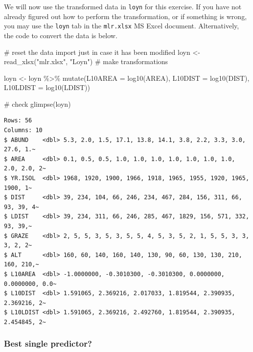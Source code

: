 \documentclass[
  10pt,
  letterpaper,
  DIV=11,
  numbers=noendperiod]{scrartcl}
\newenvironment{Shaded}{\begin{snugshade}}{\end{snugshade}}
\newcommand{\AttributeTok}[1]{\textcolor[rgb]{0.40,0.45,0.13}{#1}}
\newcommand{\CommentTok}[1]{\textcolor[rgb]{0.37,0.37,0.37}{#1}}
\newcommand{\FunctionTok}[1]{\textcolor[rgb]{0.28,0.35,0.67}{#1}}
\newcommand{\NormalTok}[1]{\textcolor[rgb]{0.00,0.23,0.31}{#1}}
\newcommand{\OtherTok}[1]{\textcolor[rgb]{0.00,0.23,0.31}{#1}}
\newcommand{\SpecialCharTok}[1]{\textcolor[rgb]{0.37,0.37,0.37}{#1}}
\newcommand{\StringTok}[1]{\textcolor[rgb]{0.13,0.47,0.30}{#1}}
\begin{document}
We will now use the transformed data in \texttt{loyn} for this exercise.
If you have not already figured out how to perform the transformation,
or if something is wrong, you may use the \texttt{loyn} tab in the
\texttt{mlr.xlsx} MS Excel document. Alternatively, the code to convert
the data is below.

\begin{Shaded}
\begin{Highlighting}[]
\CommentTok{\# reset the data import just in case it has been modified}
\NormalTok{loyn }\OtherTok{\textless{}{-}} \FunctionTok{read\_xlsx}\NormalTok{(}\StringTok{"mlr.xlsx"}\NormalTok{, }\StringTok{"Loyn"}\NormalTok{)}
\CommentTok{\# make transformations}

\NormalTok{loyn }\OtherTok{\textless{}{-}}\NormalTok{ loyn }\SpecialCharTok{\%\textgreater{}\%}
  \FunctionTok{mutate}\NormalTok{(}\AttributeTok{L10AREA =} \FunctionTok{log10}\NormalTok{(AREA),}
    \AttributeTok{L10DIST =} \FunctionTok{log10}\NormalTok{(DIST),}
    \AttributeTok{L10LDIST =} \FunctionTok{log10}\NormalTok{(LDIST))}

\CommentTok{\# check}
\FunctionTok{glimpse}\NormalTok{(loyn)}
\end{Highlighting}
\end{Shaded}

\begin{verbatim}
Rows: 56
Columns: 10
$ ABUND    <dbl> 5.3, 2.0, 1.5, 17.1, 13.8, 14.1, 3.8, 2.2, 3.3, 3.0, 27.6, 1.~
$ AREA     <dbl> 0.1, 0.5, 0.5, 1.0, 1.0, 1.0, 1.0, 1.0, 1.0, 1.0, 2.0, 2.0, 2~
$ YR.ISOL  <dbl> 1968, 1920, 1900, 1966, 1918, 1965, 1955, 1920, 1965, 1900, 1~
$ DIST     <dbl> 39, 234, 104, 66, 246, 234, 467, 284, 156, 311, 66, 93, 39, 4~
$ LDIST    <dbl> 39, 234, 311, 66, 246, 285, 467, 1829, 156, 571, 332, 93, 39,~
$ GRAZE    <dbl> 2, 5, 5, 3, 5, 3, 5, 5, 4, 5, 3, 5, 2, 1, 5, 5, 3, 3, 3, 2, 2~
$ ALT      <dbl> 160, 60, 140, 160, 140, 130, 90, 60, 130, 130, 210, 160, 210,~
$ L10AREA  <dbl> -1.0000000, -0.3010300, -0.3010300, 0.0000000, 0.0000000, 0.0~
$ L10DIST  <dbl> 1.591065, 2.369216, 2.017033, 1.819544, 2.390935, 2.369216, 2~
$ L10LDIST <dbl> 1.591065, 2.369216, 2.492760, 1.819544, 2.390935, 2.454845, 2~
\end{verbatim}

\hypertarget{best-single-predictor}{%
\subsubsection{Best single predictor?}\label{best-single-predictor}}
\end{document}

